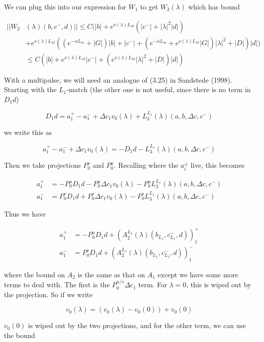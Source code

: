 \documentclass[12pt]{article}
\begin{document}
\begin{enumerate}
We can plug this into our expression for $W_1$ to get $W_2(\lambda)$ which has bound

\begin{align*}
||W_2&(\lambda)(b,c^-, d)|| \leq C(|b| + e^{\nu(\lambda)L_M}(|c^-| + |\lambda|^2 |d|) \\
&+ e^{\nu(\lambda)L_M}((e^{-\alpha L_m} + |G|) |b| + |c^-| + (e^{-\tilde{\alpha} L_m} + e^{\nu(\lambda)L_M} |G|) |\lambda|^2 + |D|) |d| )\\
&\leq C(|b| + e^{\nu(\lambda)L_M}|c^-| + (e^{\nu(\lambda)L_M} |\lambda|^2 + |D|)|d| )
\end{align*}

With a multipulse, we will need an analogue of (3.25) in Sandstede (1998). Starting with the $L_1$-match (the other one is not useful, since there is no term in $D_1 d$)

\[
D_1 d = a_1^+ - a_1^- + \Delta c_1 v_0(\lambda) + L_3^{L_1}(\lambda)(a, b, \Delta c, c^-)
\]

we write this as

\[
a_1^+ - a_1^- + \Delta c_1 v_0(\lambda) = -D_1 d - L_3^{L_1}(\lambda)(a, b, \Delta c, c^-)
\]

Then we take projections $P^s_0$ and $P^u_0$. Recalling where the $a_i^\pm$ live, this becomes 

\begin{align*}
a_1^+ &= -P^u_0 D_1 d - P^u_0 \Delta c_1 v_0(\lambda) - P^u_0 L_3^{L_1}(\lambda)(a, b, \Delta c, c^-) \\
a_1^- &=  P^s_0 D_1 d + P^s_0 \Delta c_1 v_0(\lambda) - P^s_0 L_3^{L_1}(\lambda)(a, b, \Delta c, c^-)
\end{align*}

Thus we have

\begin{align*}
a_1^+ &= -P^u_0 D_1 d + (A_2^{L_1}(\lambda)(b_{L_1}, c_{L_1}^-, d))_1^+\\
a_1^- &=  P^s_0 D_1 d + (A_2^{L_1}(\lambda)(b_{L_1}, c_{L_1}^-, d))_1^-
\end{align*}

where the bound on $A_2$ is the same as that on $A_1$ except we have some more terms to deal with. The first is the $P^{u/s}_0 \Delta c_1$ term. For $\lambda = 0$, this is wiped out by the projection. So if we write

\[
v_0(\lambda) = (v_0(\lambda) - v_0(0)) + v_0(0)
\]

$v_0(0)$ is wiped out by the two projections, and for the other term, we can use the bound


\end{enumerate}
\end{document}
